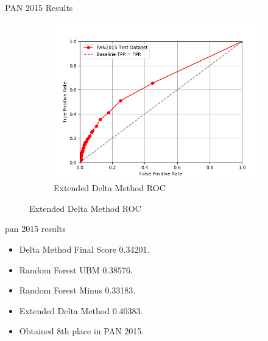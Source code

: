 \documentclass[10pt]{beamer}
\begin{document}
\begin{frame}[fragile]{PAN 2015 Results}
\begin{figure}
\begin{subfigure}{.4\textwidth}
            \includegraphics[width=\textwidth]{../../report/pictures/extended_delta_method_roc.png}
            \caption{Extended Delta Method ROC}
        \end{subfigure}
    \end{figure}
\end{frame}

\begin{frame}[fragile]{pan 2015 results}

    \begin{itemize}
        \item Delta Method Final Score 0.34201.
        \item Random Forest UBM 0.38576.
        \item Random Forest Minus 0.33183.
        \item Extended Delta Method 0.40383.
        \item Obtained 8th place in PAN 2015.
    \end{itemize}

\end{frame}
\end{document}
